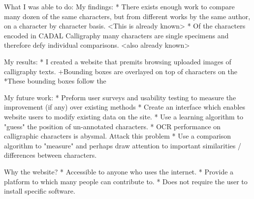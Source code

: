 What I was able to do:
    My findings:
        * There exists enough work to compare many dozen of the same characters, but from different works by the same author, on a character by character basis. <This is already known>
        *  Of the characters encoded in CADAL Calligraphy many characters are single specimens and therefore defy individual comparisons.  <also already known>
    
    My results:
        *  I created a website that premits browsing uploaded images of calligraphy texts.
            +Bounding boxes are overlayed on top of characters on the 
                *These bounding boxes follow the 
            
    My future work:
        *  Preform user surveys and usability testing to measure the improvement (if any) over existing methods
        *  Create an interface which enables website users to modify existing data on the site.
        *  Use a learning algorithm to "guess" the position of un-annotated characters.
        *  OCR performance on calligraphic characters is abysmal.  Attack this problem
        *  Use a comparison algorithm to "measure" and perhaps draw attention to important similarities / differences between characters.


Why the website?
    * Accessible to anyone who uses the internet.
    * Provide  a platform to which many people can contribute to.
    * Does not require the user to install specific software.




